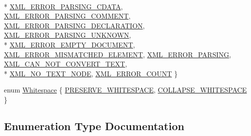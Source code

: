 \begin{DoxyCompactItemize}
\\*
\hyperlink{namespacetinyxml2_a1fbf88509c3ac88c09117b1947414e08a9d181628a1819f2b97835e6bc2c8bb3b}{X\+M\+L\+\_\+\+E\+R\+R\+O\+R\+\_\+\+P\+A\+R\+S\+I\+N\+G\+\_\+\+C\+D\+A\+T\+A}, 
\hyperlink{namespacetinyxml2_a1fbf88509c3ac88c09117b1947414e08a51786809e8b079c770853cf5890a7a35}{X\+M\+L\+\_\+\+E\+R\+R\+O\+R\+\_\+\+P\+A\+R\+S\+I\+N\+G\+\_\+\+C\+O\+M\+M\+E\+N\+T}, 
\hyperlink{namespacetinyxml2_a1fbf88509c3ac88c09117b1947414e08ad45b208578e30dab5a21bff1d8991b87}{X\+M\+L\+\_\+\+E\+R\+R\+O\+R\+\_\+\+P\+A\+R\+S\+I\+N\+G\+\_\+\+D\+E\+C\+L\+A\+R\+A\+T\+I\+O\+N}, 
\hyperlink{namespacetinyxml2_a1fbf88509c3ac88c09117b1947414e08a95a88813812a680fb7372f0149420a97}{X\+M\+L\+\_\+\+E\+R\+R\+O\+R\+\_\+\+P\+A\+R\+S\+I\+N\+G\+\_\+\+U\+N\+K\+N\+O\+W\+N}, 
\\*
\hyperlink{namespacetinyxml2_a1fbf88509c3ac88c09117b1947414e08a1a0478cf44f0a733aa6f21bdf0db80b5}{X\+M\+L\+\_\+\+E\+R\+R\+O\+R\+\_\+\+E\+M\+P\+T\+Y\+\_\+\+D\+O\+C\+U\+M\+E\+N\+T}, 
\hyperlink{namespacetinyxml2_a1fbf88509c3ac88c09117b1947414e08a0cecc816939d9155d33b8a88fd50e4c1}{X\+M\+L\+\_\+\+E\+R\+R\+O\+R\+\_\+\+M\+I\+S\+M\+A\+T\+C\+H\+E\+D\+\_\+\+E\+L\+E\+M\+E\+N\+T}, 
\hyperlink{namespacetinyxml2_a1fbf88509c3ac88c09117b1947414e08af6b4caa10e1f2e9f19a3a24f5f3ce223}{X\+M\+L\+\_\+\+E\+R\+R\+O\+R\+\_\+\+P\+A\+R\+S\+I\+N\+G}, 
\hyperlink{namespacetinyxml2_a1fbf88509c3ac88c09117b1947414e08afdb8840395a7c13dfe6a3e104401c095}{X\+M\+L\+\_\+\+C\+A\+N\+\_\+\+N\+O\+T\+\_\+\+C\+O\+N\+V\+E\+R\+T\+\_\+\+T\+E\+X\+T}, 
\\*
\hyperlink{namespacetinyxml2_a1fbf88509c3ac88c09117b1947414e08a5300bec98feccc8f0cdf567b88821f33}{X\+M\+L\+\_\+\+N\+O\+\_\+\+T\+E\+X\+T\+\_\+\+N\+O\+D\+E}, 
\hyperlink{namespacetinyxml2_a1fbf88509c3ac88c09117b1947414e08a9ebb2775c56387353f5b2de94f6ab71d}{X\+M\+L\+\_\+\+E\+R\+R\+O\+R\+\_\+\+C\+O\+U\+N\+T}
 \}
\item 
enum \hyperlink{namespacetinyxml2_a7f91d00f77360f850fd5da0861e27dd5}{Whitespace} \{ \hyperlink{namespacetinyxml2_a7f91d00f77360f850fd5da0861e27dd5a751769aa625fe5fe5286e9779edec56a}{P\+R\+E\+S\+E\+R\+V\+E\+\_\+\+W\+H\+I\+T\+E\+S\+P\+A\+C\+E}, 
\hyperlink{namespacetinyxml2_a7f91d00f77360f850fd5da0861e27dd5a9a4a309029a6f5e636e20ef5e0b65136}{C\+O\+L\+L\+A\+P\+S\+E\+\_\+\+W\+H\+I\+T\+E\+S\+P\+A\+C\+E}
 \}
\end{DoxyCompactItemize}


\subsection{Enumeration Type Documentation}
\hypertarget{namespacetinyxml2_a7f91d00f77360f850fd5da0861e27dd5}{}
